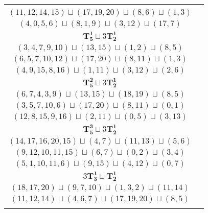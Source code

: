 \documentclass{article}
\begin{document}
\begin{longtable}{|c|c|}
\begin{tabular}{c}
        $(9,7,10,4)\sqcup(18,17,20)\sqcup(11,13)\sqcup(2,3)$ \\ 
        $(11,12,14,15)\sqcup(17,19,20)\sqcup(8,6)\sqcup(1,3)$ \\ 
        $(4,0,5,6)\sqcup(8,1,9)\sqcup(3,12)\sqcup(17,7)$
        \end{tabular} \\ 
        \hline
        $\mathbf{T_{5}^{1}} \sqcup 3\mathbf{T_{2}^{1}}$ & \begin{tabular}{c}
        $(2,4,6,9,12)\sqcup(13,14)\sqcup(18,19)\sqcup(0,1)$ \\ 
        $(3,4,7,9,10)\sqcup(13,15)\sqcup(1,2)\sqcup(8,5)$ \\ 
        $(6,5,7,10,12)\sqcup(17,20)\sqcup(8,11)\sqcup(1,3)$ \\ 
        $(4,9,15,8,16)\sqcup(1,11)\sqcup(3,12)\sqcup(2,6)$
        \end{tabular} \\ 
        \hline
        $\mathbf{T_{5}^{2}} \sqcup 3\mathbf{T_{2}^{1}}$ & \begin{tabular}{c}
        $(11,9,6,4,12)\sqcup(16,15)\sqcup(8,10)\sqcup(2,3)$ \\ 
        $(6,7,4,3,9)\sqcup(13,15)\sqcup(18,19)\sqcup(8,5)$ \\ 
        $(3,5,7,10,6)\sqcup(17,20)\sqcup(8,11)\sqcup(0,1)$ \\ 
        $(12,8,15,9,16)\sqcup(2,11)\sqcup(0,5)\sqcup(3,13)$
        \end{tabular} \\ 
        \hline
        $\mathbf{T_{5}^{3}} \sqcup 3\mathbf{T_{2}^{1}}$ & \begin{tabular}{c}
        $(13,15,16,18,14)\sqcup(9,6)\sqcup(2,4)\sqcup(5,7)$ \\ 
        $(14,17,16,20,15)\sqcup(4,7)\sqcup(11,13)\sqcup(5,6)$ \\ 
        $(9,12,10,11,15)\sqcup(6,7)\sqcup(0,2)\sqcup(3,4)$ \\ 
        $(5,1,10,11,6)\sqcup(9,15)\sqcup(4,12)\sqcup(0,7)$
        \end{tabular} \\ 
        \hline
        $3\mathbf{T_{3}^{1}} \sqcup \mathbf{T_{2}^{1}}$ & \begin{tabular}{c}
        $(18,15,13)\sqcup(11,9,6)\sqcup(0,1,2)\sqcup(16,19)$ \\ 
        $(18,17,20)\sqcup(9,7,10)\sqcup(1,3,2)\sqcup(11,14)$ \\ 
        $(11,12,14)\sqcup(4,6,7)\sqcup(17,19,20)\sqcup(8,5)$ \\ 

\end{tabular}
\end{longtable}
\end{document}
